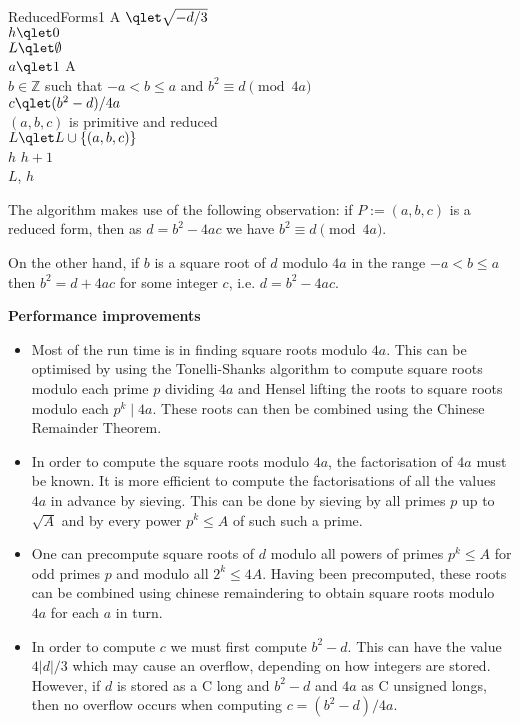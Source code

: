 \documentclass[a4paper,10pt]{amsart}
\newcommand{\Z}{\mathbb{Z}}
\begin{document}
\begin{algorithm}{ReducedForms1}{
   }
A $\qlet \sqrt{-d/3}$ \\
$h \qlet 0$ \\
$L \qlet \emptyset$ \\
\qfor $a \qlet 1$ \qto A \\
\qfor $b \in \Z$ such that $-a < b \leq a$ and $b^2 \equiv d \pmod{4a}$ \\
$c \qlet (b^2 - d)/4a$ \\
\qif $(a, b, c)$ is primitive and reduced \\
\qthen $L \qlet L \cup \{(a, b, c)\}$ \\
$h$ \qlet $h + 1$ \qfi \qrof \qrof \\
\qreturn $L$, $h$
\end{algorithm}
 
The algorithm makes use of the following observation:
if $P := (a, b, c)$ is a reduced form, then as $d = b^2 - 4ac$
we have $b^2 \equiv d \pmod{4a}$.

On the other hand, if $b$ is a square root of $d$ modulo $4a$ in the range $-a < b \leq a$ then $b^2 = d + 4ac$ for some integer $c$, i.e. $d = b^2 - 4ac$. 

\textbf{Performance improvements}

\begin{itemize}
\item Most of the run time is in finding square roots modulo $4a$. This can be optimised by using the Tonelli-Shanks algorithm to compute square roots modulo each prime $p$ dividing $4a$ and Hensel lifting the roots to square roots modulo each $p^k \;|\; 4a$. These roots can then be combined using the Chinese Remainder Theorem.

\item In order to compute the square roots modulo $4a$, the factorisation of $4a$ must be known. It is more efficient to compute the factorisations of all the values $4a$ in advance by sieving. This can be done by sieving by all primes $p$ up to $\sqrt{A}$ and by every power $p^k \leq A$ of such such a prime.

\item One can precompute square roots of $d$ modulo all powers of primes $p^k \leq A$ for odd primes $p$ and modulo all $2^k \leq 4A$. Having been precomputed, these roots can be combined using chinese remaindering to obtain square roots modulo $4a$ for each $a$ in turn.

\item In order to compute $c$ we must first compute $b^2 - d$. This can have the value $4|d|/3$ which may cause an overflow, depending on how integers are stored. However, if $d$ is stored as a C long and $b^2 - d$ and $4a$ as C unsigned longs, then no overflow occurs when computing $c = (b^2 - d)/4a$. 
\end{itemize}
\end{document}
